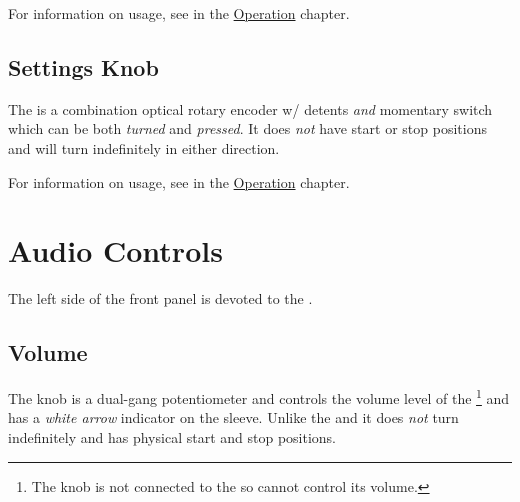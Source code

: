 For information on usage, see \hyperref[Operation - Selector Dial]{} in
the \hyperref[Operation]{Operation} chapter.

\subsection{Settings Knob} \label{Settings Knob}

The  is a combination optical rotary encoder w/ detents \textit{and}
momentary switch which can be both \textit{turned} and \textit{pressed}.  It
does \textit{not} have start or stop positions and will turn indefinitely in
either direction.

\par\medskip

For information on usage, see \hyperref[Operation - Settings Knob]{} in
the \hyperref[Operation]{Operation} chapter.

\section{Audio Controls}

The left side of the front panel is devoted to the \hyperref[Audio]{}.

\subsection{Volume} \label{Volume}

The  knob is a dual-gang potentiometer and controls the volume level of
the \footnote{ The  knob is not connected to the  so
cannot control its volume.} and has a \textit{white arrow} indicator on the
sleeve.  Unlike the \hyperref[Settings Knob]{} and
\hyperref[Brightness Knob]{} it does \textit{not} turn indefinitely and
has physical start and stop positions.

\par\medskip

